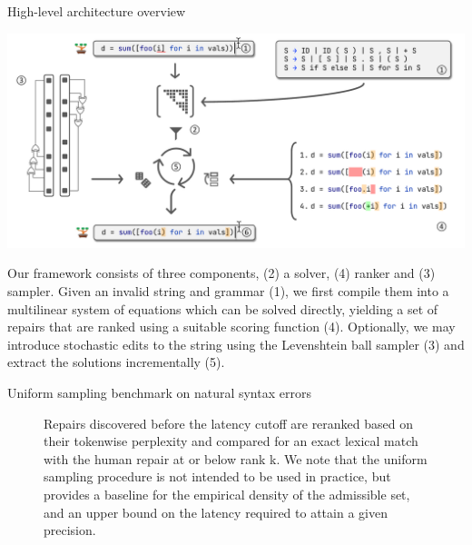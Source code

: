 \documentclass{beamer}
\begin{document}
\begin{frame}[fragile]{High-level architecture overview}
  \begin{center}
    \includegraphics[width=0.9\linewidth]{../figures/architecture_overview.pdf}
  \end{center}
  \vspace{-10pt}
  \begin{footnotesize}
    Our framework consists of three components, (2) a solver, (4) ranker and (3) sampler. Given an invalid string and grammar (1), we first compile them into a multilinear system of equations which can be solved directly, yielding a set of repairs that are ranked using a suitable scoring function (4). Optionally, we may introduce stochastic edits to the string using the Levenshtein ball sampler (3) and extract the solutions incrementally (5).
  \end{footnotesize}
\end{frame}

\begin{frame}[fragile]{Uniform sampling benchmark on natural syntax errors}
  \begin{figure}[H]
    \resizebox{.3\textwidth}{!}{}
    \resizebox{.3\textwidth}{!}{}
    \resizebox{.3\textwidth}{!}{}
    \caption{Repairs discovered before the latency cutoff are reranked based on their tokenwise perplexity and compared for an exact lexical match with the human repair at or below rank k. We note that the uniform sampling procedure is not intended to be used in practice, but provides a baseline for the empirical density of the admissible set, and an upper bound on the latency required to attain a given precision.}\label{fig:human}
  \end{figure}
\end{frame}
\end{document}
